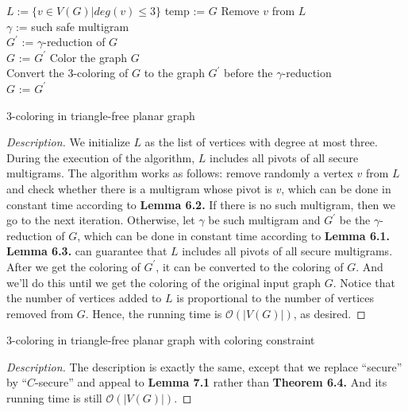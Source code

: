 \begin{algorithm}[H]
\DontPrintSemicolon
  $L := \{v \in V(G) | deg(v) \leq 3\}$  
  temp := $G$   
    { 
         Remove $v$ from $L$ \\
        {
            \Statex $\gamma$ := such safe multigram \\
            $G^{'}$ := $\gamma$-reduction of $G$ \\
            $G$ := $G^{'}$ 
        }
    }
   {
        Color the graph $G$ \\
   		Convert the 3-coloring of $G$ to the graph $G^{'}$ before the $\gamma$-reduction \\
   		$G$ := $G^{'}$
   }
\caption{3-coloring in triangle-free planar graph}
\end{algorithm}
\begin{proof}[Description] We initialize $L$ as the list of vertices with degree at most three. During the execution of the algorithm, $L$ includes all pivots of all secure multigrams. The algorithm works as follows: remove randomly a vertex $v$ from $L$ and check whether there is a multigram whose pivot is $v$, which can be done in constant time according to \textbf{Lemma 6.2.} If there is no such multigram, then we go to the next iteration. Otherwise, let $\gamma$ be such multigram and $G^{'}$ be the $\gamma$-reduction of $G$, which can be done in constant time according to \textbf{Lemma 6.1.} \textbf{Lemma 6.3.} can guarantee that $L$ includes all pivots of all secure multigrams. After we get the coloring of $G^{'}$, it can be converted to the coloring of $G$. And we'll do this until we get the coloring of the original input graph $G$. Notice that the number of vertices added to $L$ is proportional to the number of vertices removed from $G$. Hence, the running time is $\mathcal{O}(|V(G)|)$, as desired.
\end{proof}

\begin{algorithm}[H]
\DontPrintSemicolon
\caption{3-coloring in triangle-free planar graph with coloring constraint}
\end{algorithm}
\begin{proof}[Description] 
The description is exactly the same, except that we replace
“secure” by “$C$-secure” and appeal to \textbf{Lemma 7.1} rather than \textbf{Theorem 6.4.} And its running time is still $\mathcal{O}(|V(G)|)$.\cite{dvorak2013threecoloring}
\end{proof}

